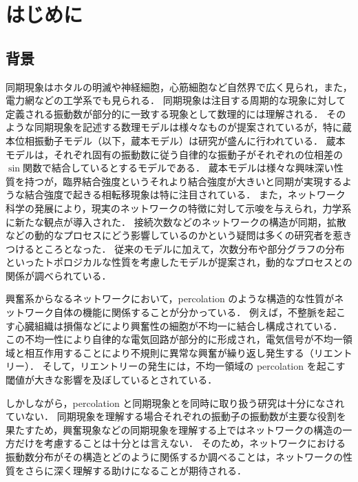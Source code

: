 \documentclass[../main]{subfiles}
\begin{document}
\chapter{はじめに}
\section{背景}
\label{chap:intro-back}
同期現象はホタルの明滅や神経細胞，心筋細胞など自然界で広く見られ\cite{Strogatz1993}，また，電力網などの工学系でも見られる\cite{Dorfler2012}．
同期現象は注目する周期的な現象に対して定義される振動数が部分的に一致する現象として数理的には理解される．
そのような同期現象を記述する数理モデルは様々なもの\cite{Winfree1967,kuramoto1975}が提案されているが，特に蔵本位相振動子モデル（以下，蔵本モデル）は研究が盛んに行われている\cite{RevModPhys.77.137}．
蔵本モデルは，それぞれ固有の振動数に従う自律的な振動子がそれぞれの位相差の$\sin$関数で結合しているとするモデルである．
蔵本モデルは様々な興味深い性質を持つが，臨界結合強度というそれより結合強度が大きいと同期が実現するような結合強度で起きる相転移現象は特に注目されている\cite{RevModPhys.77.137,RODRIGUES20161}．
また，ネットワーク科学の発展により，現実のネットワークの特徴に対して示唆を与えられ，力学系に新たな観点が導入された\cite{RODRIGUES20161}．
接続次数などのネットワークの構造が同期，拡散などの動的なプロセスにどう影響しているのかという疑問は多くの研究者を惹きつけるところとなった．
従来のモデルに加えて，次数分布や部分グラフの分布といったトポロジカルな性質を考慮したモデルが提案され，動的なプロセスとの関係が調べられている\cite{Moreno_2004,PhysRevLett.106.128701,Liu2013,PhysRevLett.124.218301}．

興奮系からなるネットワークにおいて，percolation のような構造的な性質がネットワーク自体の機能に関係することが分かっている\cite{PhysRevLett.110.158101,Pasquale2008SelforganizationAN}．
例えば，不整脈を起こす心臓組織は損傷などにより興奮性の細胞が不均一に結合し構成されている．
この不均一性により自律的な電気回路が部分的に形成され，電気信号が不均一領域と相互作用することにより不規則に異常な興奮が繰り返し発生する（リエントリー）．
そして，リエントリーの発生には，不均一領域の percolation を起こす閾値が大きな影響を及ぼしているとされている\cite{PhysRevLett.110.158101}．

しかしながら，percolation と同期現象とを同時に取り扱う研究は十分になされていない．
同期現象を理解する場合それぞれの振動子の振動数が主要な役割を果たすため，興奮現象などの同期現象を理解する上ではネットワークの構造の一方だけを考慮することは十分とは言えない．
そのため，ネットワークにおける振動数分布がその構造とどのように関係するか調べることは，ネットワークの性質をさらに深く理解する助けになることが期待される．
\end{document}
